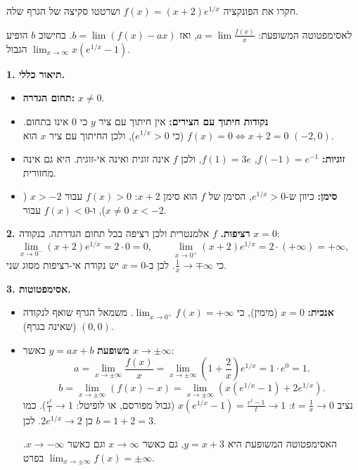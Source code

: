 
\begin{question}
חקרו את הפונקציה $f(x)=(x+2)e^{1/x}$ ושרטטו סקיצה של הגרף שלה.
\end{question}

\begin{hint}
לאסימפטוטה המשופעת: $a=\lim\frac{f(x)}{x}$, ואז $b=\lim(f(x)-ax)$. בחישוב $b$ הופיע הגבול $\lim_{x\to\infty}x\left(e^{1/x}-1\right)$.
\end{hint}

\begin{solution}
\textbf{1. תיאור כללי.}
\begin{itemize}
  \item \textbf{תחום הגדרה:} $x\neq0$.
  \item \textbf{נקודות חיתוך עם הצירים:} אין חיתוך עם ציר $y$ כי $0$ אינו בתחום. $f(x)=0\iff x+2=0$ (כי $e^{1/x}>0$), ולכן החיתוך עם ציר $x$ הוא $(-2,0)$.
  \item \textbf{זוגיות:} $f(-1)=e^{-1}$, $f(1)=3e$, ולכן $f$ אינה זוגית ואינה אי-זוגית. היא גם אינה מחזורית.
  \item \textbf{סימן:} כיוון ש-$e^{1/x}>0$, הסימן של $f$ הוא סימן $x+2$: $f(x)>0$ עבור $x>-2$ ($x\neq0$), ו-$f(x)<0$ עבור $x<-2$.
\end{itemize}

\textbf{2. רציפות.} $f$ אלמנטרית ולכן רציפה בכל תחום הגדרתה. בנקודה $x=0$:
\[ \lim_{x\to0^-}(x+2)e^{1/x}=2\cdot0=0,\qquad \lim_{x\to0^+}(x+2)e^{1/x}=2\cdot(+\infty)=+\infty, \]
כי $\frac1x\to\mp\infty$. לכן ב-$x=0$ יש נקודת אי-רציפות מסוג שני.

\textbf{3. אסימפטוטות.}
\begin{itemize}
  \item \textbf{אנכית:} $x=0$ (מימין), כי $\lim_{x\to0^+}f(x)=+\infty$. משמאל הגרף שואף לנקודה $(0,0)$ (שאינה בגרף).
  \item \textbf{משופעת} $y=ax+b$ כאשר $x\to\pm\infty$:
  \[ a=\lim_{x\to\pm\infty}\frac{f(x)}{x}=\lim_{x\to\pm\infty}\left(1+\frac2x\right)e^{1/x}=1\cdot e^0=1. \]
  \[ b=\lim_{x\to\pm\infty}\left(f(x)-x\right)=\lim_{x\to\pm\infty}\left(x\left(e^{1/x}-1\right)+2e^{1/x}\right). \]
  נציב $t=\frac1x\to0$: $x\left(e^{1/x}-1\right)=\frac{e^t-1}{t}\to1$ (גבול מפורסם, או לופיטל: $\frac{e^t}{1}\to1$). כמו כן $2e^{1/x}\to2$. לכן $b=1+2=3$.

  האסימפטוטה המשופעת היא $y=x+3$, גם כאשר $x\to\infty$ וגם כאשר $x\to-\infty$. בפרט $\lim_{x\to\pm\infty}f(x)=\pm\infty$.
\end{itemize}


\end{solution}
